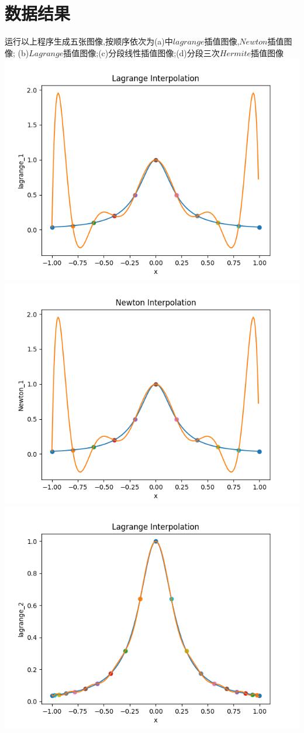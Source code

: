\documentclass[12pt, a4paper, oneside]{ctexart}
\begin{document}
\section*{数据结果}
运行以上程序生成五张图像,按顺序依次为(a)中$lagrange$插值图像,$Newton$插值图像;
(b)$Lagrange$插值图像;(c)分段线性插值图像;(d)分段三次$Hermite$插值图像\\
\includegraphics[scale=0.55]{Lagrange_1.png}
\includegraphics[scale=0.55]{Newton_1.png}
\includegraphics[scale=0.55]{Lagrange_2.png}
\end{document}
